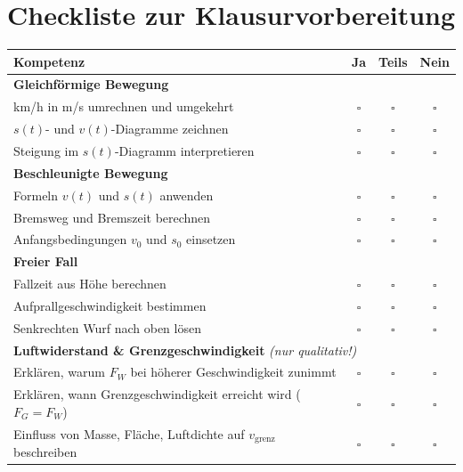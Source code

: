 \documentclass[11pt,a4paper]{article}
\begin{document}
\newpage
\section{Checkliste zur Klausurvorbereitung}

\begin{tcolorbox}[colback=lightblue, colframe=physikblue, title=\textbf{Kann ich das? -- Ehrlich ankreuzen!}]
\begin{tabular}{|p{9cm}|c|c|c|}
\hline
\rowcolor{lightblue}
\textbf{Kompetenz} & \textbf{Ja} & \textbf{Teils} & \textbf{Nein} \\
\hline
\multicolumn{4}{|l|}{\textbf{Gleichförmige Bewegung}} \\
\hline
km/h in m/s umrechnen und umgekehrt & $\square$ & $\square$ & $\square$ \\
\hline
$s(t)$- und $v(t)$-Diagramme zeichnen & $\square$ & $\square$ & $\square$ \\
\hline
Steigung im $s(t)$-Diagramm interpretieren & $\square$ & $\square$ & $\square$ \\
\hline
\multicolumn{4}{|l|}{\textbf{Beschleunigte Bewegung}} \\
\hline
Formeln $v(t)$ und $s(t)$ anwenden & $\square$ & $\square$ & $\square$ \\
\hline
Bremsweg und Bremszeit berechnen & $\square$ & $\square$ & $\square$ \\
\hline
Anfangsbedingungen $v_0$ und $s_0$ einsetzen & $\square$ & $\square$ & $\square$ \\
\hline
\multicolumn{4}{|l|}{\textbf{Freier Fall}} \\
\hline
Fallzeit aus Höhe berechnen & $\square$ & $\square$ & $\square$ \\
\hline
Aufprallgeschwindigkeit bestimmen & $\square$ & $\square$ & $\square$ \\
\hline
Senkrechten Wurf nach oben lösen & $\square$ & $\square$ & $\square$ \\
\hline
\multicolumn{4}{|l|}{\textbf{Luftwiderstand \& Grenzgeschwindigkeit} \textit{(nur qualitativ!)}} \\
\hline
Erklären, warum $F_W$ bei höherer Geschwindigkeit zunimmt & $\square$ & $\square$ & $\square$ \\
\hline
Erklären, wann Grenzgeschwindigkeit erreicht wird ($F_G = F_W$) & $\square$ & $\square$ & $\square$ \\
\hline
Einfluss von Masse, Fläche, Luftdichte auf $v_{\text{grenz}}$ beschreiben & $\square$ & $\square$ & $\square$ \\
\hline
\end{tabular}
\end{tcolorbox}
\end{document}
